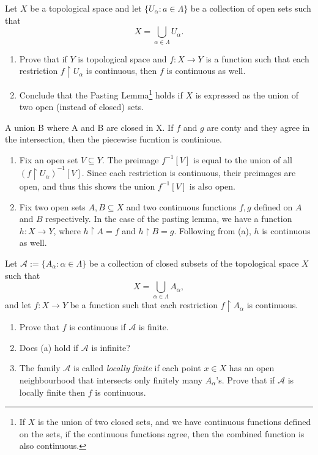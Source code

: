 \documentclass[../../main.tex]{subfiles}
\begin{document}
\begin{problem}[2]
Let $X$ be a topological space and let $\{ U_\alpha : a \in \Lambda \}$ be a collection of open sets such that
\[
	X = \bigcup_{\alpha \in \Lambda} U_\alpha.
\]
\begin{enumerate}[label=(\alph*)]
	\item Prove that if $Y$ is topological space and $f: X \to Y$ is a function such that each restriction $f\upharpoonright U_\alpha$ is continuous, then $f$ is continuous as well.
	\item Conclude that the Pasting Lemma\footnote{If $X$ is the union of two closed sets, and we have continuous functions defined on the sets, if the continuous functions agree, then the combined function is also continuous.}
	      holds if $X$ is expressed as the union of two open (instead of closed) sets.
\end{enumerate}
\end{problem}
A union B where A and B are closed in X.
If $f$ and $g$ are conty and they agree in the intersection, then the piecewise fucntion is continioue.
\begin{enumerate}[label=(\alph*)]
	\item Fix an open set $V \subseteq Y$.
	      The preimage $f^{-1}[V]$ is equal to the union of all $(f\upharpoonright U_\alpha)^{-1}[V]$.
	      Since each restriction is continuous, their preimages are open, and thus this shows the union $f^{-1}[V]$ is also open.
	\item Fix two open sets $A, B \subseteq X$ and two continuous functions $f, g$ defined on $A$ and $B$ respectively.
	      In the case of the pasting lemma, we have a function $h : X \to Y$, where $h\upharpoonright A = f$ and $h\upharpoonright B = g$.
	      Following from (a), $h$ is continuous as well.
\end{enumerate}

\begin{problem}[3, \S18 Ex.9]
Let $\mathscr{A} := \{ A_\alpha : \alpha \in \Lambda \}$ be a collection of closed subsets of the topological space $X$ such that
\[
	X= \bigcup_{\alpha \in \Lambda} A_\alpha,
\]
and let $f : X \to Y$ be a function such that each restriction $f \upharpoonright A_\alpha$ is continuous.
\begin{enumerate}[label=(\alph*)]
	\item Prove that $f$ is continuous if $\mathscr{A}$ is finite.
	\item Does (a) hold if $\mathscr{A}$ is infinite?
	\item The family $\mathscr{A}$ is called \emph{locally finite} if each point $x \in X$ has an open neighbourhood that intersects only finitely many $A_\alpha$'s.
	      Prove that if $\mathscr{A}$ is locally finite then $f$ is continuous.
\end{enumerate}
\end{problem}
\end{document}
